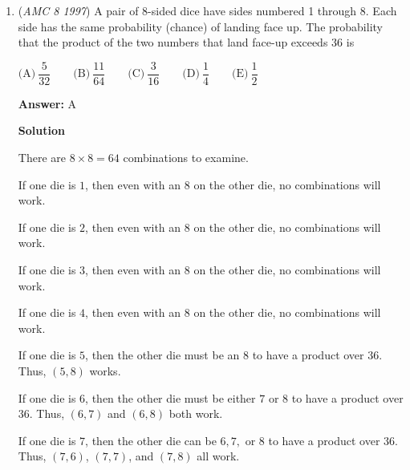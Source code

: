\begin{enumerate}
\textbf{Solution 2}

Find a pattern.  If $a=4$, then the expression is just the first two terms, which is $2$.

 If $a=5$, then the expression is the first three terms, giving $2.5$.

 If $a=6$, the expression is the first four terms, giving $3$.

 If $a=7$, the expression will be the first five terms, giving $3.5$.

 Conjecture that the expression is always going to equal $\frac{a}{2}$, and thus when $a=18$, the expression will be $9$, as desired.

 As above, when $a=18$, $b=17$, and the sum is $35$, or $\boxed{D}$



	\item (\textit{AMC 8 1997}) A pair of 8-sided dice have sides numbered 1 through 8.  Each side has the same probability (chance) of landing face up.  The probability that the product of the two numbers that land face-up exceeds 36 is


 $\text{(A)}\ \dfrac{5}{32} \qquad \text{(B)}\ \dfrac{11}{64} \qquad \text{(C)}\ \dfrac{3}{16} \qquad \text{(D)}\ \dfrac{1}{4} \qquad \text{(E)}\ \dfrac{1}{2}$

 \textbf{Answer: }A



\textbf{Solution}

There are $8 \times 8 = 64$ combinations to examine.

 If one die is $1$, then even with an $8$ on the other die, no combinations will work.

 If one die is $2$, then even with an $8$ on the other die, no combinations will work.

 If one die is $3$, then even with an $8$ on the other die, no combinations will work.

 If one die is $4$, then even with an $8$ on the other die, no combinations will work.

 If one die is $5$, then the other die must be an $8$ to have a product over $36$.  Thus, $(5,8)$ works.

 If one die is $6$, then the other die must be either $7$ or $8$ to have a product over $36$.  Thus, $(6, 7)$ and $(6, 8)$ both work.

 If one die is $7$, then the other die can be $6, 7,$ or $8$ to have a product over $36$.  Thus, $(7, 6)$, $(7, 7)$, and $(7, 8)$ all work.


\end{enumerate}
